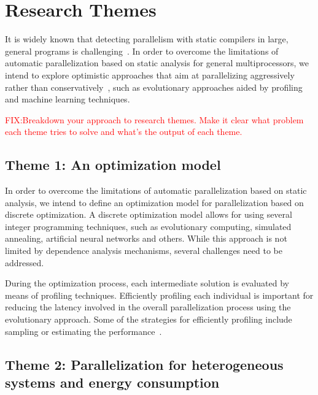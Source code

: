\documentclass[a4paper,12pt]{article}
\newcommand\FIXME[1]{\textcolor{red}{FIX:}\textcolor{red}{#1}}
\begin{document}
\section{Research Themes}\label{sec:research-dir}


It is widely known that detecting parallelism with static compilers in large,
general programs is challenging~\cite{kennedy01,chen03}.  In order to overcome
the limitations of automatic parallelization based on static analysis for
general multiprocessors, we intend to explore optimistic approaches that aim at
parallelizing aggressively rather than
conservatively~\cite{chen03,williams96,williams99}, such as evolutionary
approaches aided by profiling and machine learning techniques. 

\FIXME{Breakdown your approach to research themes. Make it 
clear what problem each theme tries to solve and what's the
output of each theme.}

\subsection{Theme 1: An optimization model}

In order to overcome the limitations of automatic parallelization based on
static analysis, we intend to define an optimization model for parallelization
based on discrete optimization. A discrete optimization model allows for using
several integer programming techniques, such as evolutionary computing,
simulated annealing, artificial neural networks and others.  While this
approach is not limited by dependence analysis mechanisms, several challenges
need to be addressed.

During the optimization process, each intermediate solution is evaluated by
means of profiling techniques.  Efficiently profiling each individual is
important for reducing the latency involved in the overall parallelization
process using the evolutionary approach.  Some of the strategies for
efficiently profiling include sampling or estimating the
performance~\cite{douskos11,misailovic11,zhu12,fahringer95b,fahringer00,fahringer11}.

\subsection{Theme 2: Parallelization for heterogeneous systems and energy
consumption}
\end{document}

